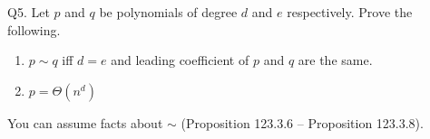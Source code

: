 \SOLUTION



\newpage
Q5. 
Let $p$ and $q$ be polynomials of degree $d$ and $e$ respectively.
Prove the following.
\begin{enumerate}
\item[(a)] $p \sim q$
  iff $d = e$ and leading coefficient of $p$ and $q$ are the same.
\item[(b)] $p = \Theta(n^d)$
\end{enumerate}
You can assume facts about $\sim$ 
(Proposition 123.3.6 -- Proposition 123.3.8).

\SOLUTION




